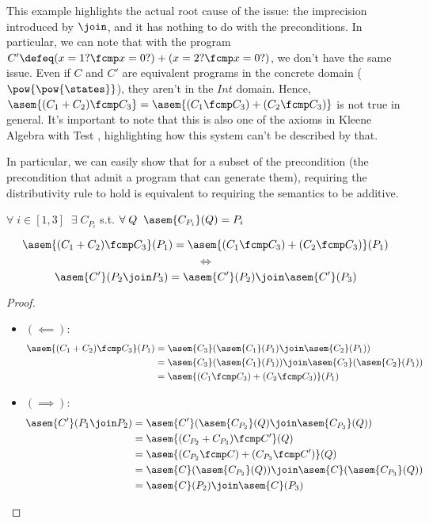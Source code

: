 This example highlights the actual root cause of the issue: the imprecision
introduced by $\join$, and it has nothing to do with the preconditions. In
particular, we can note that with the program $C' \defeq (x = 1? \fcmp x = 0?)
+ (x = 2? \fcmp x = 0?)$, we don't have the same issue. Even if $C$ and $C'$
are equivalent programs in the concrete domain ($\pow{\pow{\states}}$), they
aren't in the $Int$ domain. Hence, $\asem{(C_1 + C_2) \fcmp C_3} = \asem{(C_1
\fcmp C_3) + (C_2 \fcmp C_3)}$ is not true in general. It's important to note
that this is also one of the axioms in Kleene Algebra with Test \cite{Kozen97},
highlighting how this system can't be described by that.

In particular, we can easily show that for a subset of the precondition (the
precondition that admit a program that can generate them), requiring the
distributivity rule to hold is equivalent to requiring the semantics to be
additive.

\begin{theorem} $\;$\\
  $\forall \; i \in [1, 3] \;\; \exists \; C_{P_i}$ s.t. 
  $\forall \; Q \;\; \asem{C_{P_i}}(Q) = P_i$

  $$\asem{(C_1 + C_2) \fcmp C_3}(P_1) = \asem{(C_1 \fcmp C_3) + (C_2 \fcmp C_3)}(P_1)$$
  $$\iff$$
  $$\asem{C'}(P_2 \join P_3) = \asem{C'}(P_2) \join \asem{C'}(P_3)$$
\end{theorem}
\begin{proof} $\;$\\
  \begin{itemize}
    \item $(\impliedby)$:
      \begin{align*}
        \asem{(C_1 + C_2) \fcmp C_3}(P_1)
          &= \asem{C_3}(\asem{C_1}(P_1) \join \asem{C_2}(P_1)) \\
          &= \asem{C_3}(\asem{C_1}(P_1)) \join \asem{C_3}(\asem{C_2}(P_1)) \\
          &= \asem{(C_1 \fcmp C_3) + (C_2 \fcmp C_3)}(P_1)
      \end{align*}
    \item $(\implies)$:
      \begin{align*}
        \asem{C'}(P_1 \join P_2) 
          &= \asem{C'}(\asem{C_{P_2}}(Q) \join \asem{C_{P_3}}(Q)) \\
          &= \asem{(C_{P_2} + C_{P_3}) \fcmp C'}(Q) \\
          &= \asem{(C_{P_2} \fcmp C) + (C_{P_3} \fcmp C')}(Q) \\
          &= \asem{C}(\asem{C_{P_2}}(Q)) \join \asem{C}(\asem{C_{P_3}}(Q)) \\
          &= \asem{C}(P_2) \join \asem{C}(P_3)
      \end{align*}
  \end{itemize}
\end{proof}

